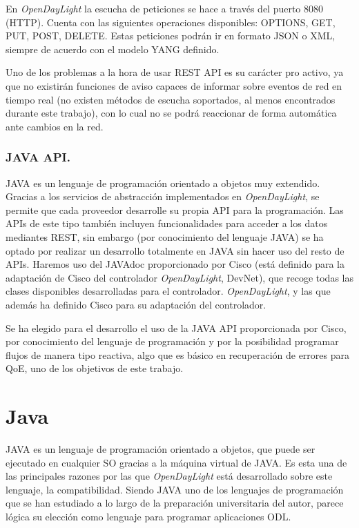 \documentclass[a4paper,11pt]{book}
\begin{document}
En \emph{OpenDayLight} la escucha de peticiones se hace a través del puerto 8080 (\ac{HTTP}). Cuenta con las siguientes operaciones disponibles:
OPTIONS, GET, PUT, POST, DELETE. Estas peticiones podrán ir en formato \ac{JSON} o \ac{XML}, siempre de acuerdo con el modelo YANG definido.
 
Uno de los problemas a la hora de usar \ac{REST} \ac{API} es su carácter pro activo, ya que no existirán funciones de aviso capaces de informar sobre eventos de red en tiempo real (no existen métodos de escucha soportados, al menos encontrados durante este trabajo), con lo cual no se podrá reaccionar de forma automática ante cambios en la red.

\subsubsection{JAVA \ac{API}.} JAVA es un lenguaje de programación orientado a objetos muy extendido. Gracias a los servicios de abstracción implementados en \emph{OpenDayLight}, se permite que cada proveedor desarrolle su propia \ac{API} para la programación. Las \ac{API}s de este tipo también incluyen funcionalidades para acceder a los datos mediantes \ac{REST}, sin embargo (por conocimiento del lenguaje JAVA) se ha optado por realizar un desarrollo totalmente en JAVA sin hacer uso del resto de \ac{API}s. Haremos uso del JAVAdoc proporcionado por Cisco \cite{ciscojavadoc} (está definido para la adaptación de Cisco del controlador \emph{OpenDayLight}, DevNet), que recoge todas las clases disponibles desarrolladas para el controlador. \emph{OpenDayLight}, y las que además ha definido Cisco para su adaptación del controlador. 

Se ha elegido para el desarrollo el uso de la JAVA \ac{API} proporcionada por Cisco, por conocimiento del lenguaje de programación y por la posibilidad programar flujos de manera tipo reactiva, algo que es básico en recuperación de errores para \ac{QoE}, uno de los objetivos de este trabajo.

\section{Java}

JAVA es un lenguaje de programación orientado a objetos, que puede ser ejecutado en cualquier \ac{SO} gracias a la máquina virtual de JAVA. Es esta una de las principales razones por las que \emph{OpenDayLight} está desarrollado sobre este lenguaje, la compatibilidad. Siendo JAVA uno de los lenguajes de programación que se han estudiado a lo largo de la preparación universitaria del autor, parece lógica su elección como lenguaje para programar aplicaciones \ac{ODL}. 
\end{document}
